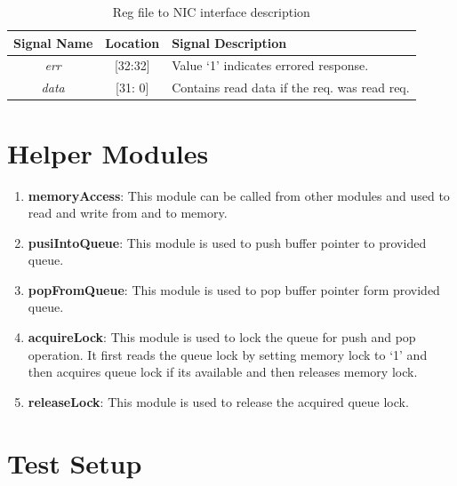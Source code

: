 \documentclass[12pt]{report}
\begin{document}
				\begin{table}[!htbp]
					\centering
					\begin{tabular}{ccl}
						\hline
						\textbf{Signal Name} 		& \textbf{Location} 		&\textbf{Signal Description}  \\ \hline
						\textit{err}			& [32:32]			& Value `1' indicates errored response.\\\hline
						\textit{data}   		& [31: 0] 			& Contains read data if the req. was read req.\\ \hline
					\end{tabular}
					\caption{ Reg file to NIC interface description}
					\label{tab:Reg-NIC-interface-resp}
				\end{table}


		\section{Helper Modules}
			\begin{enumerate}
				\item \textbf{memoryAccess}: This module can be called from other modules and used to read and write from and to memory. 
				\item \textbf{pusiIntoQueue}: This module is used to push buffer pointer to provided queue. 
				\item \textbf{popFromQueue}: This module is used to pop buffer pointer form provided queue. 
				\item \textbf{acquireLock}: This module is used to lock the queue for push and pop operation. It first reads the queue lock by setting memory lock to `1' and then acquires queue lock if its available and then releases memory lock.
				\item \textbf{releaseLock}: This module is used to release the acquired queue lock.
			\end{enumerate}	

	\section{Test Setup}
\end{document}
